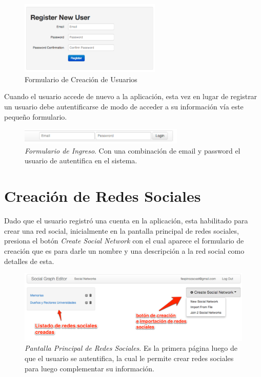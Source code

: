 \begin{figure}[H]
  \centering
  \includegraphics[width=0.6\textwidth]{images/creacion_usuario.png}
  \caption{Formulario de Creación de Usuarios}
  \label{creacion_usuario}
\end{figure}

Cuando el usuario accede de nuevo a la aplicación, esta vez en lugar de registrar un usuario debe autentificarse de modo de acceder a su información vía este pequeño formulario.

\begin{figure}[H]
  \centering
  \includegraphics[width=0.7\textwidth]{images/login.png}
  \caption[Formulario de Ingreso]{\emph{Formulario de Ingreso}. Con una combinación de email y password el usuario de autentifica en el sistema.}
  \label{login}
\end{figure}


\section{Creación de Redes Sociales} %
\label{sec:creacion_de_redes_sociales}

Dado que el usuario registró una cuenta en la aplicación, esta habilitado para crear una red social, inicialmente en la pantalla principal de redes sociales, presiona el botón \emph{Create Social Network} con el cual aparece el formulario de creación que es para darle un nombre y una descripción a la red social como detalles de esta.

\begin{figure}[H]
  \centering
  \includegraphics[width=1.0\textwidth]{images/principal_social_networks.png}
  \caption[Pantalla Principal de Redes Sociales]{\emph{Pantalla Principal de Redes Sociales}. Es la primera página luego de que el usuario se autentifica, la cual le permite crear redes sociales para luego complementar su información.}
  \label{principal_social_network}
\end{figure}

